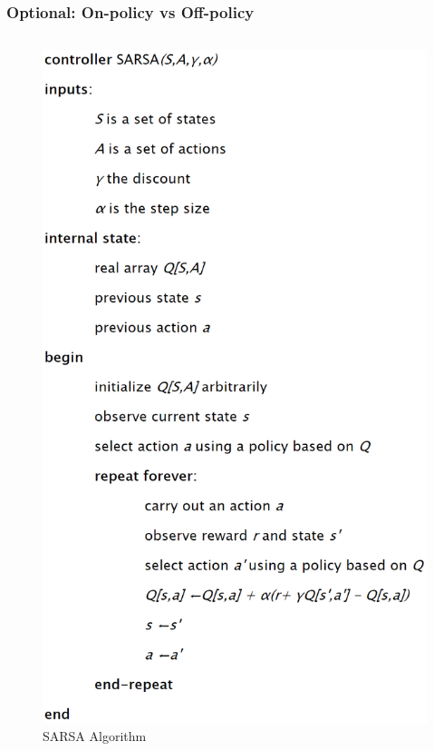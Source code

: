 \documentclass{beamer}
\begin{document}
    \begin{frame}
      \frametitle{Optional: On-policy vs Off-policy}
      \begin{columns}[b]
          \centering
          \begin{figure}
            \includegraphics[height=.75\textheight]{Images/SARSA.png}
            \caption{SARSA Algorithm}
            \label{fig:SARSAAlgorithm}
          \end{figure}
           \centering

\end{columns}
\end{frame}
\end{document}
